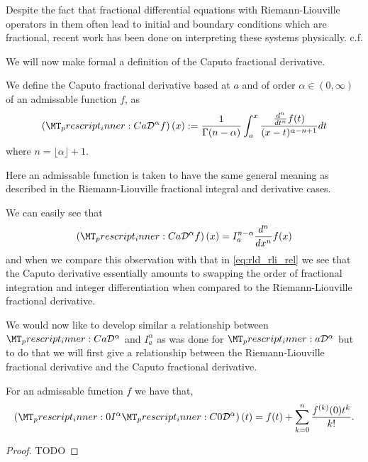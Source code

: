 Despite the fact that fractional differential equations with Riemann-Liouville operators in them often lead to initial and boundary conditions which are fractional, recent work has been done on interpreting these systems physically. c.f. \cite{Heymans2005}

We will now make formal a definition of the Caputo fractional derivative.
\begin{definition}
    We define the Caputo fractional derivative based at $ a $ and of order $\alpha \in (0, \infty) $ of an admissable function $ f $, as
    \begin{align*}
        \capder{a}{}{\alpha}{f}(x)      := \frac{1}{\Gamma(n - \alpha)} \int_a^x \frac{\frac{d^n}{dt^n}f(t)}{(x-t)^{\alpha -n + 1}} dt
    \end{align*}
    where $ n = \lfloor \alpha \rfloor + 1 $.
\end{definition}
Here an admissable function is taken to have the same general meaning as described in the Riemann-Liouville fractional integral and derivative cases.

We can easily see that
\begin{align}
    \label{eq:cap_rli_rel}
    \capder{a}{}{\alpha}{f}(x) = I_a^{n-\alpha} \frac{d^n}{dx^n} f(x)
\end{align}
and when we compare this observation with that in \eqref{eq:rld_rli_rel} we see that the Caputo derivative essentially amounts to swapping the order of fractional integration and integer differentiation when compared to the Riemann-Liouville fractional derivative.

We would now like to develop similar a relationship between $ \prescript{C}{a}{\mathcal{D}}^\alpha $ and $ I_a^\alpha $ as was done for $ \prescript{}{a}{\mathcal{D}}^\alpha $ but to do that we will first give a relationship between the Riemann-Liouville fractional derivative and the Caputo fractional derivative.

\begin{mdframed}[innertopmargin=10pt]
\begin{lemma}
    \label{lem:rli-cap}
    For an admissable function $ f $ we have that,
    \begin{align}
		    \left(\prescript{}{0}{I}^\alpha \prescript{C}{0}{\mathcal{D}}^\alpha \right)(t) = f(t) + \sum_{k=0}^{n} \frac{f^{(k)}(0)t^{k}}{k!}.
    \end{align}
\end{lemma}
\end{mdframed}
\begin{proof}
    TODO
\end{proof}

